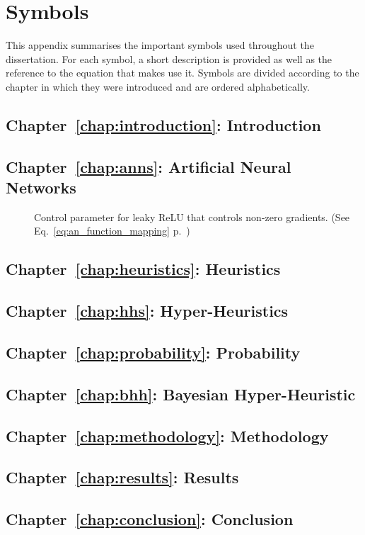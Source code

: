 \chapter{Symbols}
\label{app:symbols}

This appendix summarises the important symbols used throughout the dissertation. For each symbol, a short description is provided as well as the reference to the equation that makes use it. Symbols are divided according to the chapter in which they were introduced and are ordered alphabetically.

\section{Chapter~\ref{chap:introduction}: Introduction}
\label{sec:symbols:introduction}

\section{Chapter~\ref{chap:anns}: Artificial Neural Networks}
\label{sec:symbols:anns}

\begin{description}
	\item
	      [\parbox{1cm}{$\alpha$}] Control parameter for leaky ReLU that controls non-zero gradients. (See Eq.~\eqref{eq:an_function_mapping} p.~\pageref{eq:an_function_mapping})
\end{description}

\section{Chapter~\ref{chap:heuristics}: Heuristics}
\label{sec:symbols:heuristics}

\section{Chapter~\ref{chap:hhs}: Hyper-Heuristics}
\label{sec:symbols:hhs}

\section{Chapter~\ref{chap:probability}: Probability}
\label{sec:symbols:probability}

\section{Chapter~\ref{chap:bhh}: Bayesian Hyper-Heuristic}
\label{sec:symbols:bhh}

\section{Chapter~\ref{chap:methodology}: Methodology}
\label{sec:symbols:methodology}

\section{Chapter~\ref{chap:results}: Results}
\label{sec:symbols:results}

\section{Chapter~\ref{chap:conclusion}: Conclusion}
\label{sec:symbols:conclusion}